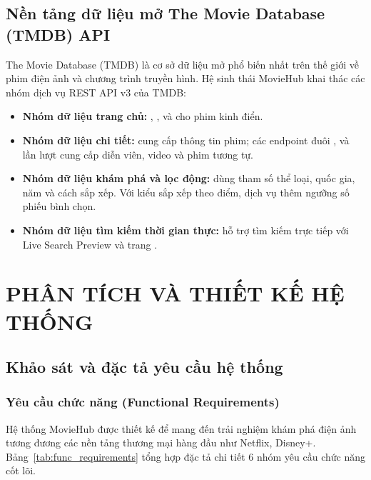 \documentclass[12pt,a4paper]{extarticle}
\begin{document}
\subsection{Nền tảng dữ liệu mở The Movie Database (TMDB) API}

The Movie Database (TMDB) \cite{tmdb_api} là cơ sở dữ liệu mở phổ biến nhất trên thế giới về phim điện ảnh và chương trình truyền hình. Hệ sinh thái MovieHub khai thác các nhóm dịch vụ REST API v3 của TMDB:
\begin{itemize}[noitemsep]
    \item \textbf{Nhóm dữ liệu trang chủ:} , ,  và  cho phim kinh điển.
    \item \textbf{Nhóm dữ liệu chi tiết:}  cung cấp thông tin phim; các endpoint đuôi ,  và  lần lượt cung cấp diễn viên, video và phim tương tự.
    \item \textbf{Nhóm dữ liệu khám phá và lọc động:}  dùng tham số thể loại, quốc gia, năm và cách sắp xếp. Với kiểu sắp xếp theo điểm, dịch vụ thêm ngưỡng số phiếu bình chọn.
    \item \textbf{Nhóm dữ liệu tìm kiếm thời gian thực:}  hỗ trợ tìm kiếm trực tiếp với Live Search Preview và trang .
\end{itemize}

\newpage
\section{PHÂN TÍCH VÀ THIẾT KẾ HỆ THỐNG}

\subsection{Khảo sát và đặc tả yêu cầu hệ thống}

\subsubsection{Yêu cầu chức năng (Functional Requirements)}
Hệ thống MovieHub được thiết kế để mang đến trải nghiệm khám phá điện ảnh tương đương các nền tảng thương mại hàng đầu như Netflix, Disney+. Bảng~\ref{tab:func_requirements} tổng hợp đặc tả chi tiết 6 nhóm yêu cầu chức năng cốt lõi.
\end{document}
